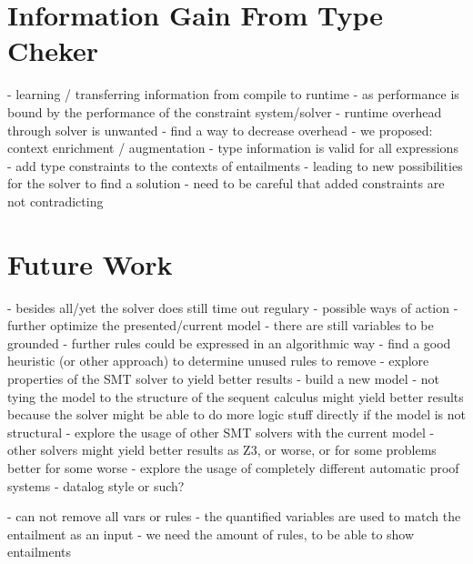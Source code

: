 \section{Information Gain From Type Cheker}
- learning / transferring information from compile to runtime
  - as performance is bound by the performance of the constraint system/solver
  - runtime overhead through solver is unwanted
  - find a way to decrease overhead
  - we proposed: context enrichment / augmentation
  - type information is valid for all expressions
  - add type constraints to the contexts of entailments
  - leading to new possibilities for the solver to find a solution
  - need to be careful that added constraints are not contradicting

\section{Future Work}
  - besides all/yet the solver does still time out regulary
  - possible ways of action
    - further optimize the presented/current model
      - there are still variables to be grounded
      - further rules could be expressed in an algorithmic way
      - find a good heuristic (or other approach) to determine unused rules to remove
      - explore properties of the SMT solver to yield better results
    - build a new model
      - not tying the model to the structure of the sequent calculus might yield better results
        because the solver might be able to do more logic stuff directly if the model is not structural
    - explore the usage of other SMT solvers with the current model
      - other solvers might yield better results as Z3,
        or worse, or for some problems better for some worse
    - explore the usage of completely different automatic proof systems
      - datalog style or such?


  


- can not remove all vars or rules
- the quantified variables are used to match the entailment as an input
- we need the amount of rules, to be able to show entailments


